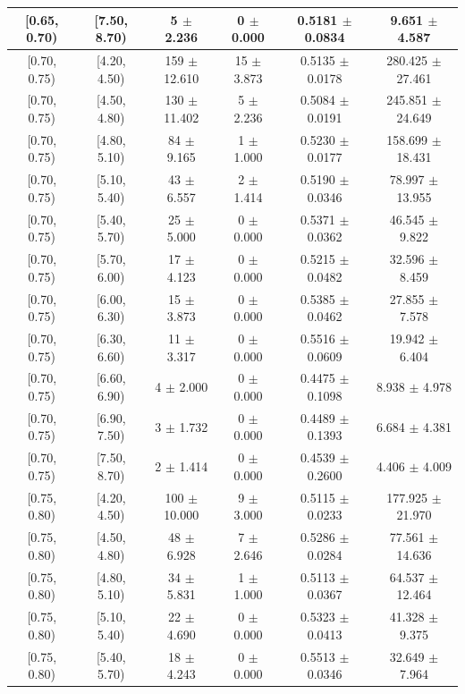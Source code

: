 \begin{longtable}{|c|c|c|c|c|c|}
\hline
[0.65, 0.70) & [7.50, 8.70) & 5 $\pm$ 2.236 & 0 $\pm$ 0.000 & 0.5181 $\pm$ 0.0834 & 9.651 $\pm$ 4.587 \\ 
\hline
[0.70, 0.75) & [4.20, 4.50) & 159 $\pm$ 12.610 & 15 $\pm$ 3.873 & 0.5135 $\pm$ 0.0178 & 280.425 $\pm$ 27.461 \\ 
\hline
[0.70, 0.75) & [4.50, 4.80) & 130 $\pm$ 11.402 & 5 $\pm$ 2.236 & 0.5084 $\pm$ 0.0191 & 245.851 $\pm$ 24.649 \\ 
\hline
[0.70, 0.75) & [4.80, 5.10) & 84 $\pm$ 9.165 & 1 $\pm$ 1.000 & 0.5230 $\pm$ 0.0177 & 158.699 $\pm$ 18.431 \\ 
\hline
[0.70, 0.75) & [5.10, 5.40) & 43 $\pm$ 6.557 & 2 $\pm$ 1.414 & 0.5190 $\pm$ 0.0346 & 78.997 $\pm$ 13.955 \\ 
\hline
[0.70, 0.75) & [5.40, 5.70) & 25 $\pm$ 5.000 & 0 $\pm$ 0.000 & 0.5371 $\pm$ 0.0362 & 46.545 $\pm$ 9.822 \\ 
\hline
[0.70, 0.75) & [5.70, 6.00) & 17 $\pm$ 4.123 & 0 $\pm$ 0.000 & 0.5215 $\pm$ 0.0482 & 32.596 $\pm$ 8.459 \\ 
\hline
[0.70, 0.75) & [6.00, 6.30) & 15 $\pm$ 3.873 & 0 $\pm$ 0.000 & 0.5385 $\pm$ 0.0462 & 27.855 $\pm$ 7.578 \\ 
\hline
[0.70, 0.75) & [6.30, 6.60) & 11 $\pm$ 3.317 & 0 $\pm$ 0.000 & 0.5516 $\pm$ 0.0609 & 19.942 $\pm$ 6.404 \\ 
\hline
[0.70, 0.75) & [6.60, 6.90) & 4 $\pm$ 2.000 & 0 $\pm$ 0.000 & 0.4475 $\pm$ 0.1098 & 8.938 $\pm$ 4.978 \\ 
\hline
[0.70, 0.75) & [6.90, 7.50) & 3 $\pm$ 1.732 & 0 $\pm$ 0.000 & 0.4489 $\pm$ 0.1393 & 6.684 $\pm$ 4.381 \\ 
\hline
[0.70, 0.75) & [7.50, 8.70) & 2 $\pm$ 1.414 & 0 $\pm$ 0.000 & 0.4539 $\pm$ 0.2600 & 4.406 $\pm$ 4.009 \\ 
\hline
[0.75, 0.80) & [4.20, 4.50) & 100 $\pm$ 10.000 & 9 $\pm$ 3.000 & 0.5115 $\pm$ 0.0233 & 177.925 $\pm$ 21.970 \\ 
\hline
[0.75, 0.80) & [4.50, 4.80) & 48 $\pm$ 6.928 & 7 $\pm$ 2.646 & 0.5286 $\pm$ 0.0284 & 77.561 $\pm$ 14.636 \\ 
\hline
[0.75, 0.80) & [4.80, 5.10) & 34 $\pm$ 5.831 & 1 $\pm$ 1.000 & 0.5113 $\pm$ 0.0367 & 64.537 $\pm$ 12.464 \\ 
\hline
[0.75, 0.80) & [5.10, 5.40) & 22 $\pm$ 4.690 & 0 $\pm$ 0.000 & 0.5323 $\pm$ 0.0413 & 41.328 $\pm$ 9.375 \\ 
\hline
[0.75, 0.80) & [5.40, 5.70) & 18 $\pm$ 4.243 & 0 $\pm$ 0.000 & 0.5513 $\pm$ 0.0346 & 32.649 $\pm$ 7.964 \\ 

\end{longtable}
